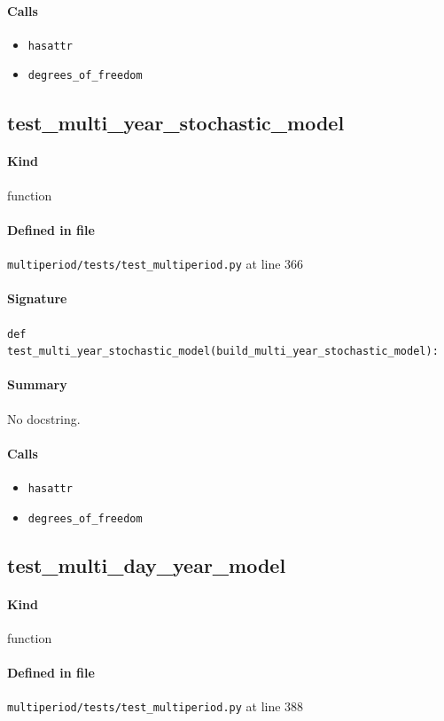 \documentclass[11pt]{report}
\begin{document}
\paragraph{Calls}
\begin{itemize}[leftmargin=*]
  \item \texttt{hasattr}
  \item \texttt{degrees\_of\_freedom}
\end{itemize}
\subsection{test\_multi\_year\_stochastic\_model}
\label{def:multiperiod-tests-test_multiperiod.py:test_multi_year_stochastic_model:L366}
\paragraph{Kind} function
\paragraph{Defined in file} \texttt{multiperiod/tests/test\_multiperiod.py} at line 366
\paragraph{Signature} \texttt{def test\_multi\_year\_stochastic\_model(build\_multi\_year\_stochastic\_model):}
\paragraph{Summary} No docstring.
\paragraph{Calls}
\begin{itemize}[leftmargin=*]
  \item \texttt{hasattr}
  \item \texttt{degrees\_of\_freedom}
\end{itemize}
\subsection{test\_multi\_day\_year\_model}
\label{def:multiperiod-tests-test_multiperiod.py:test_multi_day_year_model:L388}
\paragraph{Kind} function
\paragraph{Defined in file} \texttt{multiperiod/tests/test\_multiperiod.py} at line 388
\end{document}
